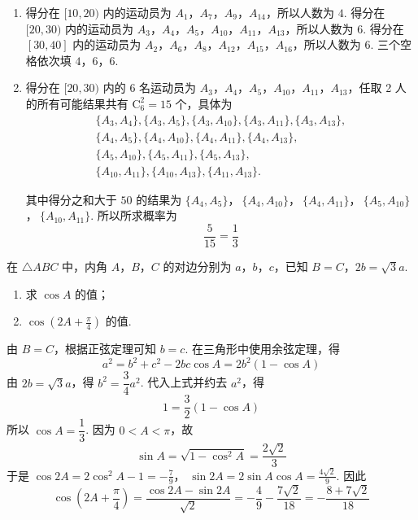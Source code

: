 \begin{solution}
\begin{enumerate}
\item 得分在 \([10,20)\) 内的运动员为 \(A_1\)，\(A_7\)，\(A_9\)，\(A_{14}\)，所以人数为 \(4\). 得分在 \([20,30)\) 内的运动员为 \(A_3\)，\(A_4\)，\(A_5\)，\(A_{10}\)，\(A_{11}\)，\(A_{13}\)，所以人数为 \(6\). 得分在 \([30,40]\) 内的运动员为 \(A_2\)，\(A_6\)，\(A_8\)，\(A_{12}\)，\(A_{15}\)，\(A_{16}\)，所以人数为 \(6\). 三个空格依次填 \(4\)，\(6\)，\(6\).

\item 得分在 \([20,30)\) 内的 6 名运动员为 \(A_3\)，\(A_4\)，\(A_5\)，\(A_{10}\)，\(A_{11}\)，\(A_{13}\)，任取 2 人的所有可能结果共有 \(\mathrm C_6^2=15\) 个，具体为
\[
\begin{gathered}
\{A_3,A_4\},\{A_3,A_5\},\{A_3,A_{10}\},\{A_3,A_{11}\},\{A_3,A_{13}\},\\
\{A_4,A_5\},\{A_4,A_{10}\},\{A_4,A_{11}\},\{A_4,A_{13}\},\\
\{A_5,A_{10}\},\{A_5,A_{11}\},\{A_5,A_{13}\},\\
\{A_{10},A_{11}\},\{A_{10},A_{13}\},\{A_{11},A_{13}\}.
\end{gathered}
\]

其中得分之和大于 \(50\) 的结果为
\(\{A_4,A_5\}\)，\(\ \{A_4,A_{10}\}\)，\(\ \{A_4,A_{11}\}\)，\(\ \{A_5,A_{10}\}\)，\(\ \{A_{10},A_{11}\}\).
所以所求概率为
\[
\frac{5}{15}=\frac13
\]
\end{enumerate}
\end{solution}

\begin{problem}
在 \(\triangle ABC\) 中，内角 \(A\)，\(B\)，\(C\) 的对边分别为 \(a\)，\(b\)，\(c\)，已知 \(B = C\)，\(2b = \sqrt{3}a\).
\begin{enumerate}
\item 求 \(\cos A\) 的值；
\item \(\cos \left(2A + \frac{\pi}{4}\right)\) 的值.
\end{enumerate}
\end{problem}

\begin{solution}
由 \(B=C\)，根据正弦定理可知 \(b=c\). 在三角形中使用余弦定理，得
\[
a^2=b^2+c^2-2bc\cos A=2b^2(1-\cos A)
\]
由 \(2b=\sqrt3a\)，得 \(b^2=\dfrac34a^2\). 代入上式并约去 \(a^2\)，得
\[
1=\frac32(1-\cos A)
\]
所以 \(\cos A=\dfrac13\). 因为 \(0<A<\pi\)，故
\[
\sin A=\sqrt{1-\cos^2A}=\frac{2\sqrt2}{3}
\]
于是 \(\cos2A=2\cos^2A-1=-\frac79\)，
\(\sin2A=2\sin A\cos A=\frac{4\sqrt2}{9}\).
因此
\[
\cos\left(2A+\frac\pi4\right)
=\frac{\cos2A-\sin2A}{\sqrt2}
=-\frac{4}{9}-\frac{7\sqrt2}{18}
=-\frac{8+7\sqrt2}{18}
\]
\end{solution}

